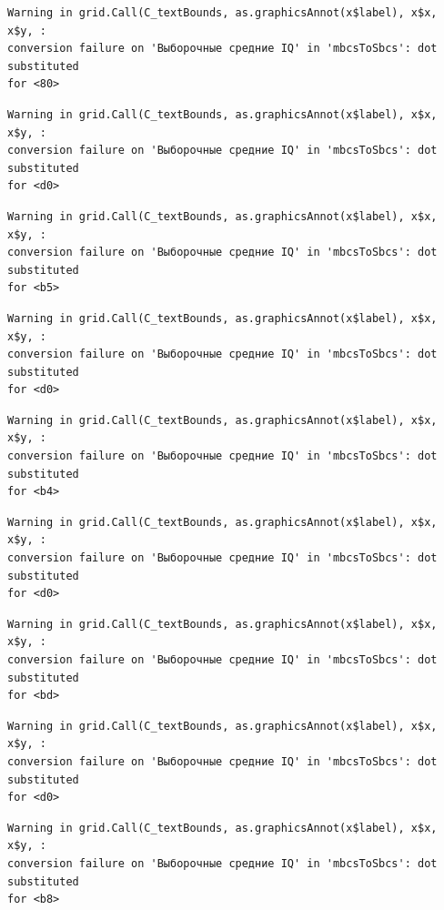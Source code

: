 \documentclass[
  letterpaper,
  DIV=11,
  numbers=noendperiod]{scrreprt}
\theoremstyle{definition}
\theoremstyle{remark}
\begin{document}
\begin{verbatim}
Warning in grid.Call(C_textBounds, as.graphicsAnnot(x$label), x$x, x$y, :
conversion failure on 'Выборочные средние IQ' in 'mbcsToSbcs': dot substituted
for <80>
\end{verbatim}

\begin{verbatim}
Warning in grid.Call(C_textBounds, as.graphicsAnnot(x$label), x$x, x$y, :
conversion failure on 'Выборочные средние IQ' in 'mbcsToSbcs': dot substituted
for <d0>
\end{verbatim}

\begin{verbatim}
Warning in grid.Call(C_textBounds, as.graphicsAnnot(x$label), x$x, x$y, :
conversion failure on 'Выборочные средние IQ' in 'mbcsToSbcs': dot substituted
for <b5>
\end{verbatim}

\begin{verbatim}
Warning in grid.Call(C_textBounds, as.graphicsAnnot(x$label), x$x, x$y, :
conversion failure on 'Выборочные средние IQ' in 'mbcsToSbcs': dot substituted
for <d0>
\end{verbatim}

\begin{verbatim}
Warning in grid.Call(C_textBounds, as.graphicsAnnot(x$label), x$x, x$y, :
conversion failure on 'Выборочные средние IQ' in 'mbcsToSbcs': dot substituted
for <b4>
\end{verbatim}

\begin{verbatim}
Warning in grid.Call(C_textBounds, as.graphicsAnnot(x$label), x$x, x$y, :
conversion failure on 'Выборочные средние IQ' in 'mbcsToSbcs': dot substituted
for <d0>
\end{verbatim}

\begin{verbatim}
Warning in grid.Call(C_textBounds, as.graphicsAnnot(x$label), x$x, x$y, :
conversion failure on 'Выборочные средние IQ' in 'mbcsToSbcs': dot substituted
for <bd>
\end{verbatim}

\begin{verbatim}
Warning in grid.Call(C_textBounds, as.graphicsAnnot(x$label), x$x, x$y, :
conversion failure on 'Выборочные средние IQ' in 'mbcsToSbcs': dot substituted
for <d0>
\end{verbatim}

\begin{verbatim}
Warning in grid.Call(C_textBounds, as.graphicsAnnot(x$label), x$x, x$y, :
conversion failure on 'Выборочные средние IQ' in 'mbcsToSbcs': dot substituted
for <b8>
\end{verbatim}
\end{document}

